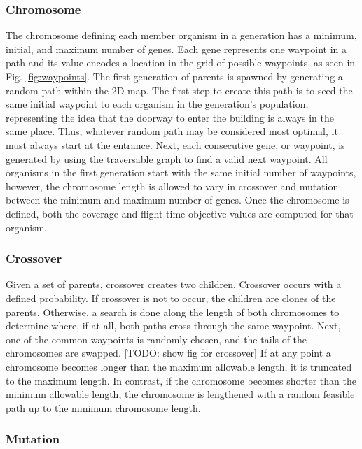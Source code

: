 \documentclass[letterpaper, 10 pt, conference]{ieeeconf}  %
\newcommand{\todo}[1]{{\color{blue}[TODO: #1]}}
\begin{document}
\subsubsection{Chromosome}

The chromosome defining each member organism in a generation has a minimum, initial, and maximum number of genes. Each gene represents one waypoint in a path and its value encodes a location in the grid of possible waypoints, as seen in Fig. \ref{fig:waypoints}. The first generation of parents is spawned by generating a random path within the 2D map. The first step to create this path is to seed the same initial waypoint to each organism in the generation's population, representing the idea that the doorway to enter the building is always in the same place. Thus, whatever random path may be considered most optimal, it must always start at the entrance. Next, each consecutive gene, or waypoint, is generated by using the traversable graph to find a valid next waypoint. All organisms in the first generation start with the same initial number of waypoints, however, the chromosome length is allowed to vary in crossover and mutation between the minimum and maximum number of genes. Once the chromosome is defined, both the coverage and flight time objective values are computed for that organism.

\subsubsection{Crossover}

Given a set of parents, crossover creates two children. Crossover occurs with a defined probability. If crossover is not to occur, the children are clones of the parents. Otherwise, a search is done along the length of both chromosomes to determine where, if at all, both paths cross through the same waypoint. Next, one of the common waypoints is randomly chosen, and the tails of the chromosomes are swapped. \todo{show fig for crossover} If at any point a chromosome becomes longer than the maximum allowable length, it is truncated to the maximum length. In contrast, if the chromosome becomes shorter than the minimum allowable length, the chromosome is lengthened with a random feasible path up to the minimum chromosome length.

\subsubsection{Mutation}
\end{document}
